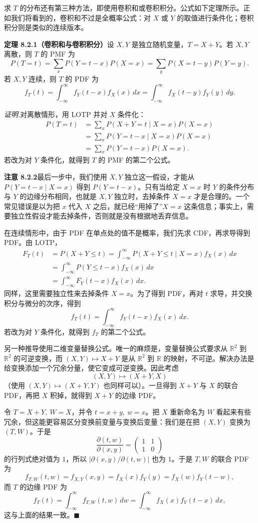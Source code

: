 \documentclass[UTF8, 12pt, fontset=fandol, oneside]{ctexart}
\begin{document}
求 $T$ 的分布还有第三种方法，即使用卷积和或卷积积分。公式如下定理所示。正如我们将看到的，卷积和不过是全概率公式：对 $X$ 或 $Y$ 的取值进行条件化；卷积积分则是类似的连续版本。

\noindent\textbf{定理 8.2.1（卷积和与卷积积分）}\quad 设 $X,Y$ 是独立随机变量，$T=X+Y$。若 $X,Y$ 离散，则 $T$ 的 PMF 为
\[
  P(T=t)=\sum_x P(Y=t-x)P(X=x)
  =\sum_y P(X=t-y)P(Y=y).
\]
若 $X,Y$ 连续，则 $T$ 的 PDF 为
\[
  f_T(t)=\int_{-\infty}^{\infty} f_Y(t-x)f_X(x)\,dx
  =\int_{-\infty}^{\infty} f_X(t-y)f_Y(y)\,dy.
\]

\noindent\textit{证明.}\quad 对离散情形，用 LOTP 并对 $X$ 条件化：
\[
\begin{aligned}
  P(T=t)
  &=\sum_x P(X+Y=t\mid X=x)P(X=x)\\
  &=\sum_x P(Y=t-x\mid X=x)P(X=x)\\
  &=\sum_x P(Y=t-x)P(X=x).
\end{aligned}
\]
若改为对 $Y$ 条件化，就得到 $T$ 的 PMF 的第二个公式。

\noindent\textbf{注意 8.2.2}\quad 最后一步中，我们使用 $X,Y$ 独立这一假设，才能从 $P(Y=t-x\mid X=x)$ 得到 $P(Y=t-x)$。只有当给定 $X=x$ 时 $Y$ 的条件分布与 $Y$ 的边缘分布相同，也就是 $X,Y$ 独立时，去掉条件 $X=x$ 才是合理的。一个常见错误是以为把 $x$ 代入 $X$ 之后，就已经“用掉了”$X=x$ 这条信息；事实上，需要独立性假设才能去掉条件，否则就是没有根据地丢弃信息。

在连续情形中，由于 PDF 在单点处的值不是概率，我们先求 CDF，再求导得到 PDF。由 LOTP，
\[
\begin{aligned}
  F_T(t)
  &=P(X+Y\le t)
    =\int_{-\infty}^{\infty}P(X+Y\le t\mid X=x)f_X(x)\,dx\\
  &=\int_{-\infty}^{\infty}P(Y\le t-x)f_X(x)\,dx\\
  &=\int_{-\infty}^{\infty}F_Y(t-x)f_X(x)\,dx.
\end{aligned}
\]
同样，这里需要独立性来去掉条件 $X=x$。为了得到 PDF，再对 $t$ 求导，并交换积分与微分的次序，得到
\[
  f_T(t)=\int_{-\infty}^{\infty}f_Y(t-x)f_X(x)\,dx.
\]
若改为对 $Y$ 条件化，就得到 $f_T$ 的第二个公式。

另一种推导使用二维变量替换公式。唯一的麻烦是，变量替换公式要求从 $\mathbb R^2$ 到 $\mathbb R^2$ 的可逆变换，而 $(X,Y)\mapsto X+Y$ 是从 $\mathbb R^2$ 到 $\mathbb R$ 的映射，不可逆。解决办法是给变换添加一个冗余分量，使它变成可逆变换。因此考虑
\[
  (X,Y)\mapsto (X+Y,X)
\]
（使用 $(X,Y)\mapsto (X+Y,Y)$ 也同样可以）。一旦得到 $X+Y$ 与 $X$ 的联合 PDF，再把 $X$ 积掉，就得到 $X+Y$ 的边缘 PDF。

令 $T=X+Y,\ W=X$，并令 $t=x+y,\ w=x$。把 $X$ 重新命名为 $W$ 看起来有些冗余，但这能更容易区分变换前变量与变换后变量：我们是在把 $(X,Y)$ 变换为 $(T,W)$。于是
\[
  \frac{\partial(t,w)}{\partial(x,y)}
  =
  \begin{pmatrix}
    1 & 1\\
    1 & 0
  \end{pmatrix}
\]
的行列式绝对值为 $1$，所以 $\left|\partial(x,y)/\partial(t,w)\right|$ 也为 $1$。于是 $T,W$ 的联合 PDF 为
\[
  f_{T,W}(t,w)=f_{X,Y}(x,y)=f_X(x)f_Y(y)=f_X(w)f_Y(t-w),
\]
而 $T$ 的边缘 PDF 为
\[
  f_T(t)=\int_{-\infty}^{\infty}f_{T,W}(t,w)\,dw
  =\int_{-\infty}^{\infty}f_X(x)f_Y(t-x)\,dx,
\]
这与上面的结果一致。$\blacksquare$
\end{document}
